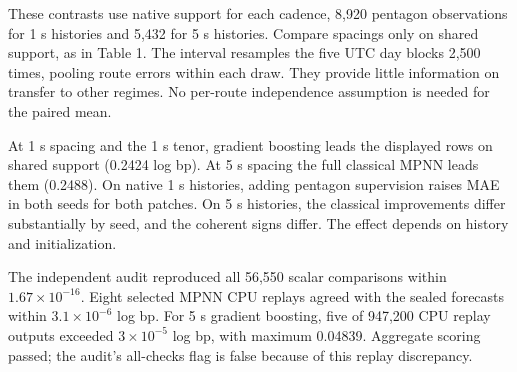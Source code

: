 \documentclass[10pt,letterpaper]{article}
\newcommand{\sub}[1]{\par\vspace{7pt}{\large\sffamily\bfseries\color{ink}#1}\par\vspace{2pt}}
\begin{document}
These contrasts use native support for each cadence, 8,920 pentagon observations for 1 s histories and 5,432 for 5 s histories. Compare spacings only on shared support, as in Table 1. The interval resamples the five UTC day blocks 2,500 times, pooling route errors within each draw. They provide little information on transfer to other regimes. No per-route independence assumption is needed for the paired mean.
\sub{Reading the scores}
At 1 s spacing and the 1 s tenor, gradient boosting leads the displayed rows on shared support (0.2424 log bp). At 5 s spacing the full classical MPNN leads them (0.2488). On native 1 s histories, adding pentagon supervision raises MAE in both seeds for both patches. On 5 s histories, the classical improvements differ substantially by seed, and the coherent signs differ. The effect depends on history and initialization.

The independent audit reproduced all 56,550 scalar comparisons within $1.67\times10^{-16}$. Eight selected MPNN CPU replays agreed with the sealed forecasts within $3.1\times10^{-6}$ log bp. For 5 s gradient boosting, five of 947,200 CPU replay outputs exceeded $3\times10^{-5}$ log bp, with maximum 0.04839. Aggregate scoring passed; the audit's all-checks flag is false because of this replay discrepancy.
\end{document}

